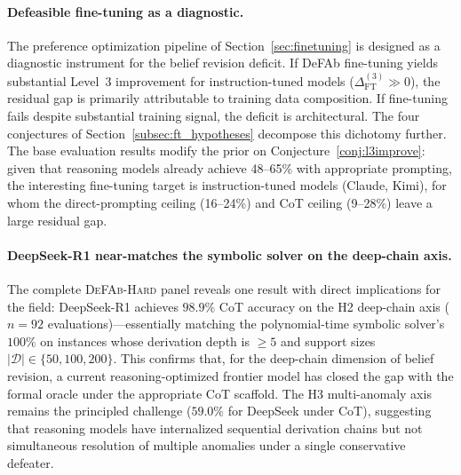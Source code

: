\documentclass{article}
\theoremstyle{definition}
\newcommand{\D}{\mathcal{D}}
\begin{document}
\paragraph{Defeasible fine-tuning as a diagnostic.} The preference optimization pipeline of Section~\ref{sec:finetuning} is designed as a diagnostic instrument for the belief revision deficit. If DeFAb fine-tuning yields substantial Level~3 improvement for instruction-tuned models ($\Delta_{\mathrm{FT}}^{(3)} \gg 0$), the residual gap is primarily attributable to training data composition. If fine-tuning fails despite substantial training signal, the deficit is architectural. The four conjectures of Section~\ref{subsec:ft_hypotheses} decompose this dichotomy further. The base evaluation results modify the prior on Conjecture~\ref{conj:l3improve}: given that reasoning models already achieve 48--65\% with appropriate prompting, the interesting fine-tuning target is instruction-tuned models (Claude, Kimi), for whom the direct-prompting ceiling (16--24\%) and CoT ceiling (9--28\%) leave a large residual gap.

\paragraph{DeepSeek-R1 near-matches the symbolic solver on the deep-chain axis.} The complete \textsc{DeFAb-Hard} panel reveals one result with direct implications for the field: DeepSeek-R1 achieves $98.9\%$ CoT accuracy on the H2 deep-chain axis ($n=92$ evaluations)---essentially matching the polynomial-time symbolic solver's $100\%$ on instances whose derivation depth is $\geq 5$ and support sizes $|\D| \in \{50, 100, 200\}$. This confirms that, for the deep-chain dimension of belief revision, a current reasoning-optimized frontier model has closed the gap with the formal oracle under the appropriate CoT scaffold. The H3 multi-anomaly axis remains the principled challenge ($59.0\%$ for DeepSeek under CoT), suggesting that reasoning models have internalized sequential derivation chains but not simultaneous resolution of multiple anomalies under a single conservative defeater.
\end{document}
